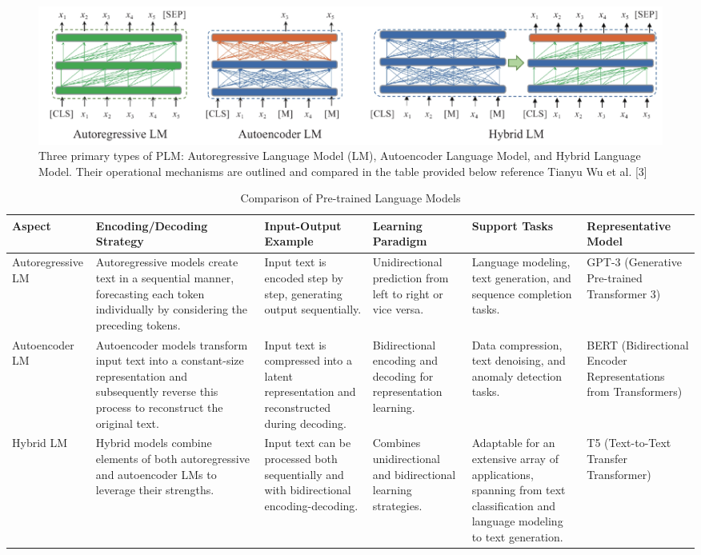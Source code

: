 \documentclass[conference]{IEEEtran}
\begin{document}
\begin{figure}
    \centering
    \includegraphics[width=\textwidth]{LMTYPES}
    \caption{Three primary types of PLM: Autoregressive Language Model (LM), Autoencoder Language Model, and Hybrid Language Model. Their operational mechanisms are outlined and compared in the table provided below reference Tianyu Wu et al. [3]}
    \label{fig:your_image_label}
\end{figure}


\begin{table}
    \centering
    \caption{Comparison of Pre-trained Language Models}
    \begin{tabular}{|p{2cm}|p{3cm}|p{3cm}|p{2cm}|p{2cm}|p{2 cm}|}
        \hline
\center
        \textbf{Aspect} & \textbf{Encoding/Decoding Strategy} & \textbf{Input-Output Example} & \textbf{Learning Paradigm} & \textbf{Support Tasks} & \textbf{Representative Model} \\
        \hline
\center
        Autoregressive LM & Autoregressive models create text in a sequential manner, forecasting each token individually by considering the preceding tokens. & Input text is encoded step by step, generating output sequentially. & Unidirectional prediction from left to right or vice versa. & Language modeling, text generation, and sequence completion tasks. & GPT-3 (Generative Pre-trained Transformer 3) \\
        \hline
\center
        Autoencoder LM & Autoencoder models transform input text into a constant-size representation and subsequently reverse this process to reconstruct the original text. & Input text is compressed into a latent representation and reconstructed during decoding. & Bidirectional encoding and decoding for representation learning. & Data compression, text denoising, and anomaly detection tasks. & BERT (Bidirectional Encoder Representations from Transformers) \\
        \hline
\center
        Hybrid LM & Hybrid models combine elements of both autoregressive and autoencoder LMs to leverage their strengths. & Input text can be processed both sequentially and with bidirectional encoding-decoding. & Combines unidirectional and bidirectional learning strategies. & Adaptable for an extensive array of applications, spanning from text classification and language modeling to text generation. & T5 (Text-to-Text Transfer Transformer) \\
        \hline
    \end{tabular}
\end{table}
\end{document}
